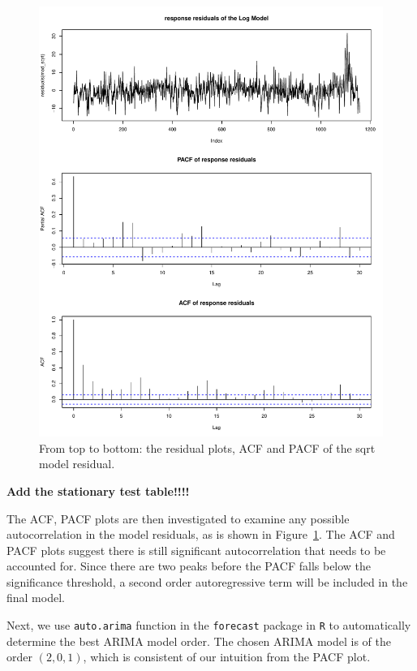 \documentclass [11pt, proquest] {uwthesis}[2015/03/03]
\begin{document}
\begin{figure}
   \includegraphics[width=1\textwidth]{figures/residual_acfpcf} 
  \caption{From top to bottom: the residual plots, ACF and PACF of the sqrt model residual.}
  \label{fig:residual_acfpcf}
\end{figure}

\textbf{Add the stationary test table!!!!}

The ACF, PACF plots are then investigated to examine any possible autocorrelation in the model residuals, as is shown in Figure~\ref{fig:residual_acfpcf}. The ACF and PACF plots suggest there is still significant autocorrelation that needs to be accounted for. Since there are two peaks before the PACF falls below the significance threshold, a second order autoregressive term will be included in the final model.

Next, we use \texttt{auto.arima} function in the \texttt{forecast} package in \texttt{R} to automatically determine the best ARIMA model order. The chosen ARIMA model is of the order $(2,0,1)$, which is consistent of our intuition from the PACF plot. 
\end{document}
